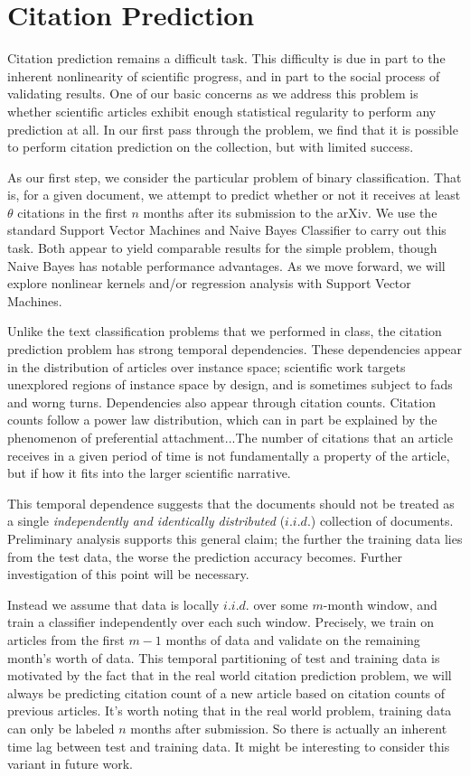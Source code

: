 \documentclass[letterpaper]{article}
\begin{document}
\section{Citation Prediction}
Citation prediction remains a difficult task.  This difficulty is due in part to the inherent nonlinearity of scientific progress, and in part to the social process of validating results.  One of our basic concerns as we address this problem is whether scientific articles exhibit enough  statistical regularity to perform any prediction at all.  In our first pass through the problem, we find that it is possible to perform citation prediction on the collection, but with limited success. 

As our first step, we consider the particular problem of binary classification.  That is,  for a given document, we attempt to predict whether or not it receives at least $\theta$ citations in the first $n$ months after its submission to the arXiv.    We use the standard Support Vector Machines and Naive Bayes Classifier to carry out this task.  Both appear to yield comparable results for the simple problem, though Naive Bayes has notable performance advantages.  As we move forward, we will explore nonlinear kernels  and/or regression analysis with Support Vector Machines. 

Unlike the text classification problems that we  performed in class,  the citation prediction problem has strong temporal dependencies.  These dependencies appear in  the distribution of articles over instance space; scientific work targets unexplored regions of instance space by design, and is sometimes subject to fads and worng turns.  Dependencies also  appear through citation counts. Citation counts follow a power law distribution, which can in part be explained by the phenomenon of preferential attachment...The number of citations that an article receives  in a given period of time is not fundamentally a property of the article, but if how it  fits into the larger scientific narrative. 

This temporal dependence suggests that the documents should not be treated as a single \textit{independently and identically distributed} ($i.i.d.$) collection of documents.  Preliminary analysis supports this general claim; the further the training data lies from the test data, the worse the prediction accuracy becomes. Further investigation of this point will be necessary.  

Instead we assume that data is locally $i.i.d.$ over some $m$-month window, and train a classifier independently over each  such window.  Precisely, we train on articles from the first $m-1$ months of data and validate on the remaining month's worth of data. This temporal partitioning of test and training data is motivated by the fact that in the real world citation prediction problem, we will always be predicting citation count of a new article based on citation counts of previous articles.   It's worth noting that in the real world problem, training data can only be labeled $n$ months after submission.   So there is actually an inherent time lag between test and training data.  It might be interesting to consider this variant in future work.
\end{document}
